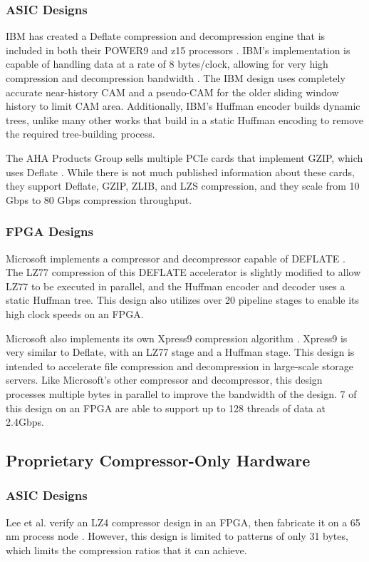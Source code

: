 \documentclass[doublespace,draft,nopageskip]{VTthesis} %
\begin{document}
\subsubsection{ASIC Designs}\label{sss:asic_designs}
IBM has created a Deflate compression and decompression engine that is included in both their POWER9 and z15 processors \cite{ibm}. IBM's implementation is capable of handling data at a rate of 8 bytes/clock, allowing for very high compression and decompression bandwidth \cite{ibm}. The IBM design uses completely accurate near-history CAM and a pseudo-CAM for the older sliding window history to limit CAM area. Additionally, IBM's Huffman encoder builds dynamic trees, unlike many other works that build in a static Huffman encoding to remove the required tree-building process.

The AHA Products Group sells multiple PCIe cards that implement GZIP, which uses Deflate \cite{aha}. While there is not much published information about these cards, they support Deflate, GZIP, ZLIB, and LZS compression, and they scale from 10 Gbps to 80 Gbps compression throughput.

\subsubsection{FPGA Designs}\label{sss:fpga_designs}

Microsoft implements a compressor and decompressor capable of DEFLATE \cite{microsoft}. The LZ77 compression of this DEFLATE accelerator is slightly modified to allow LZ77 to be executed in parallel, and the Huffman encoder and decoder uses a static Huffman tree. This design also utilizes over 20 pipeline stages to enable its high clock speeds on an FPGA.

Microsoft also implements its own Xpress9 compression algorithm \cite{xpress9}. Xpress9 is very similar to Deflate, with an LZ77 stage and a Huffman stage. This design is intended to accelerate file compression and decompression in large-scale storage servers. Like Microsoft's other compressor and decompressor, this design processes multiple bytes in parallel to improve the bandwidth of the design. 7 of this design on an FPGA are able to support up to 128 threads of data at 2.4Gbps.

\subsection{Proprietary Compressor-Only Hardware}\label{proprietary_compressor-only_hardware}
\subsubsection{ASIC Designs}\label{sss:asic_designs}
Lee et al. verify an LZ4 compressor design in an FPGA, then fabricate it on a 65 nm process node \cite{hardwarelz4}. However, this design is limited to patterns of only 31 bytes, which limits the compression ratios that it can achieve.
\end{document}
